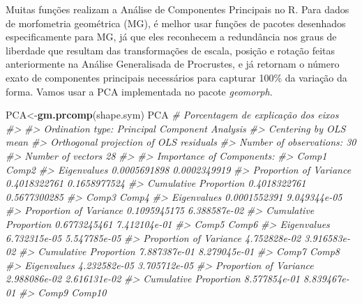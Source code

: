 \documentclass[
]{book}
\newenvironment{Shaded}{\begin{snugshade}}{\end{snugshade}}
\newcommand{\CommentTok}[1]{\textcolor[rgb]{0.56,0.35,0.01}{\textit{#1}}}
\newcommand{\FunctionTok}[1]{\textcolor[rgb]{0.13,0.29,0.53}{\textbf{#1}}}
\newcommand{\NormalTok}[1]{#1}
\newcommand{\OtherTok}[1]{\textcolor[rgb]{0.56,0.35,0.01}{#1}}
\begin{document}
Muitas funções realizam a Análise de Componentes Principais no R. Para dados de morfometria geométrica (MG), é melhor usar funções de pacotes desenhados especificamente para MG, já que eles reconhecem a redundância nos graus de liberdade que resultam das transformações de escala, posição e rotação feitas anteriormente na Análise Generalisada de Procrustes, e já retornam o número exato de componentes principais necessários para capturar 100\% da variação da forma. Vamos usar a PCA implementada no pacote \emph{geomorph}.

\begin{Shaded}
\begin{Highlighting}[]
\NormalTok{PCA}\OtherTok{\textless{}{-}}\FunctionTok{gm.prcomp}\NormalTok{(shape.sym)}
\NormalTok{PCA }\CommentTok{\# Porcentagem de explicação dos eixos}
\CommentTok{\#\textgreater{} }
\CommentTok{\#\textgreater{} Ordination type: Principal Component Analysis }
\CommentTok{\#\textgreater{} Centering by OLS mean}
\CommentTok{\#\textgreater{} Orthogonal projection of OLS residuals}
\CommentTok{\#\textgreater{} Number of observations: 30 }
\CommentTok{\#\textgreater{} Number of vectors 28 }
\CommentTok{\#\textgreater{} }
\CommentTok{\#\textgreater{} Importance of Components:}
\CommentTok{\#\textgreater{}                               Comp1        Comp2}
\CommentTok{\#\textgreater{} Eigenvalues            0.0005691898 0.0002349919}
\CommentTok{\#\textgreater{} Proportion of Variance 0.4018322761 0.1658977524}
\CommentTok{\#\textgreater{} Cumulative Proportion  0.4018322761 0.5677300285}
\CommentTok{\#\textgreater{}                               Comp3        Comp4}
\CommentTok{\#\textgreater{} Eigenvalues            0.0001552391 9.049344e{-}05}
\CommentTok{\#\textgreater{} Proportion of Variance 0.1095945175 6.388587e{-}02}
\CommentTok{\#\textgreater{} Cumulative Proportion  0.6773245461 7.412104e{-}01}
\CommentTok{\#\textgreater{}                               Comp5        Comp6}
\CommentTok{\#\textgreater{} Eigenvalues            6.732315e{-}05 5.547785e{-}05}
\CommentTok{\#\textgreater{} Proportion of Variance 4.752828e{-}02 3.916583e{-}02}
\CommentTok{\#\textgreater{} Cumulative Proportion  7.887387e{-}01 8.279045e{-}01}
\CommentTok{\#\textgreater{}                               Comp7        Comp8}
\CommentTok{\#\textgreater{} Eigenvalues            4.232582e{-}05 3.705712e{-}05}
\CommentTok{\#\textgreater{} Proportion of Variance 2.988086e{-}02 2.616131e{-}02}
\CommentTok{\#\textgreater{} Cumulative Proportion  8.577854e{-}01 8.839467e{-}01}
\CommentTok{\#\textgreater{}                               Comp9       Comp10}

\end{Highlighting}
\end{Shaded}
\end{document}
